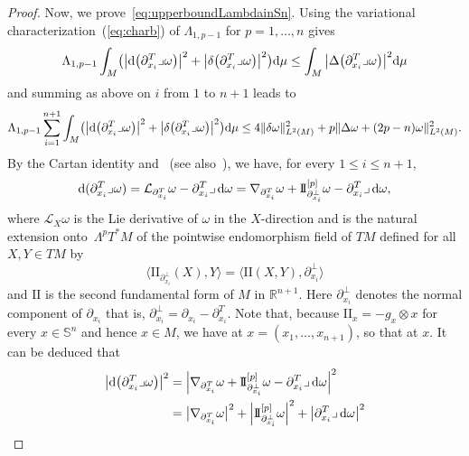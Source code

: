 \documentclass[pdftex]{sigma}
\newcommand{\R}{{\mathbb R}}
\numberwithin{equation}{section}
\theoremstyle{definition}
\begin{document}
\begin{proof}
Now, we prove~\eqref{eq:upperboundLambdainSn}. Using the variational characterization~(\ref{eq:charb}) of $\Lambda_{1,p-1}$ for $p=1,\dots,n$ gives
\[
\Lambda_{1,p-1}\int_{M}\bigl(\bigl|{\rm d}\bigl(\partial_{x_i}^T\lrcorner\omega\bigr)\bigr|^2+\bigl|\delta\bigl(\partial_{x_i}^T\lrcorner\omega\bigr)\bigr|^2\bigr){\rm d}\mu\leq \int_M\big|\Delta\bigl(\partial_{x_i}^T\lrcorner\omega\bigr)\big|^2{\rm d}\mu
\]
and summing as above on $i$ from $1$ to $n+1$ leads to
\[
\Lambda_{1,p-1}\sum_{i=1}^{n+1}\int_{M}\bigl(\bigl|{\rm d}\bigl(\partial_{x_i}^T\lrcorner\omega\bigr)\bigr|^2+\bigl|\delta\bigl(\partial_{x_i}^T\lrcorner\omega\bigr)\bigr|^2\bigr){\rm d}\mu\leq 4\|\delta\omega\|^2_{L^2(M)}+p\|\Delta\omega+(2p-n)\omega\|^2_{L^2(M)}.
\]
By the Cartan identity and~\cite[formula~(4.3)]{GueriniSavo2004} (see also~\cite[formula~(20)]{EGHM}), we have, for every $1\leq i\leq n+1$,
\begin{align*}
{\rm d}(\partial_{x_i}^T\lrcorner\omega)=\mathcal{L}_{\partial_{x_i}^T}\omega-\partial_{x_i}^T\lrcorner\,{\rm d}\omega
=\nabla_{\partial_{x_i}^T}\omega+\mathrm{I\!I}_{\partial^\perp_{x_i}}^{[p]}\omega-\partial_{x_i}^T\lrcorner\,{\rm d}\omega,
\end{align*}
where $\mathcal{L}_X\omega$ is the Lie derivative of $\omega$ in the $X$-direction and  is the natural extension onto~$\Lambda^p T^*M$ of the pointwise endomorphism field  of $TM$ defined for all $X,Y\in TM$ by
\[
\bigl\langle \mathrm{I\!I}_{\partial^\perp_{x_i}}(X),Y\bigr\rangle = \bigl\langle\mathrm{I\!I}(X,Y),\partial^\perp_{x_i}\bigr\rangle
\] and $\mathrm{I\!I}$ is the second fundamental form of $M$ in $\R^{n+1}$.
Here $\partial^\perp_{x_i}$ denotes the normal component of $\partial_{x_i}$ that is, $\partial^\perp_{x_i}=\partial_{x_i}-\partial^T_{x_i}$.
Note that, because $\mathrm{I\!I}_x=-g_x\otimes x$ for every $x\in\mathbb{S}^n$ and hence $x\in M$, we have  at $x=(x_1,\dots,x_{n+1})$, so that  at $x$.
It can be deduced that
\begin{align*}
\bigl|{\rm d} \bigl(\partial_{x_i}^T\lrcorner\omega\bigr)\bigr|^2 ={}&\Bigl|\nabla_{\partial_{x_i}^T}\omega+\mathrm{I\!I}_{\partial^\perp_{x_i}}^{[p]}\omega-\partial_{x_i}^T\lrcorner\,{\rm d}\omega\Bigr|^2\\
={}&\bigl|\nabla_{\partial_{x_i}^T}\omega\bigr|^2+\Bigl|\mathrm{I\!I}_{\partial^\perp_{x_i}}^{[p]}\omega\Bigr|^2+\bigl|\partial_{x_i}^T\lrcorner\,{\rm d}\omega\bigr|^2\\

\end{align*}
\end{proof}
\end{document}
